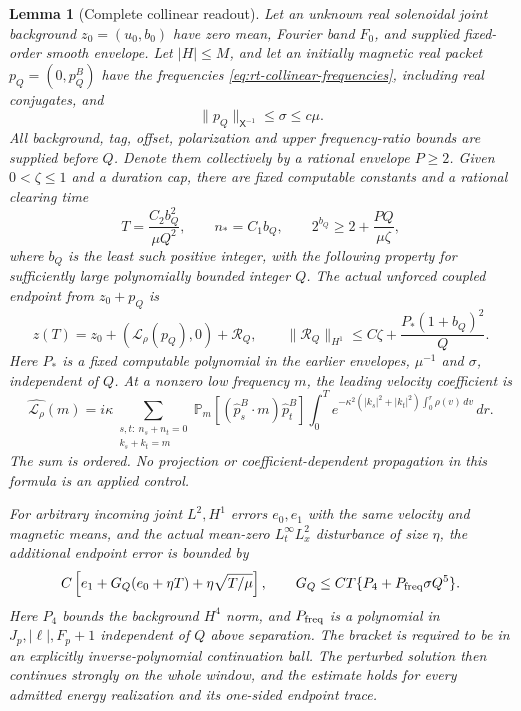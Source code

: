 \documentclass[11pt,a4paper]{amsart}
\newtheorem{lemma}[theorem]{Lemma}
\theoremstyle{definition}
\theoremstyle{remark}
\numberwithin{equation}{section}
\newcommand{\PP}{\mathbb P}
\newcommand{\norm}[1]{\lVert #1\rVert}
\begin{document}
\begin{lemma}[Complete collinear readout]\label{lem:collinear-readout}
Let an unknown real solenoidal joint background $z_0=(u_0,b_0)$ have
zero mean, Fourier band $F_0$, and supplied fixed-order smooth envelope.
Let $|H|\le M$, and let an initially magnetic real packet $p_Q=(0,p_Q^B)$
have the frequencies \eqref{eq:rt-collinear-frequencies}, including real
conjugates, and
\begin{equation}\label{eq:rt-critical-budget}
 \norm{p_Q}_{\mathsf X^{-1}}\le\sigma\le c\mu.
\end{equation}
All background, tag, offset, polarization and upper frequency-ratio bounds
are supplied before $Q$.  Denote them collectively by a rational envelope
$P\ge2$.  Given $0<\zeta\le1$ and a duration cap, there are fixed
computable constants and a rational clearing time
\begin{equation}\label{eq:rt-clearing-time}
 T=\frac{C_2 b_Q^2}{\mu Q^2},\qquad
 n_*=C_1b_Q,\qquad
 2^{b_Q}\ge 2+\frac{PQ}{\mu\zeta},
\end{equation}
where $b_Q$ is the least such positive integer, with the following
property for sufficiently large polynomially bounded integer $Q$.
The actual unforced coupled endpoint from $z_0+p_Q$ is
\begin{equation}\label{eq:rt-complete-endpoint}
 z(T)=z_0+(\mathcal L_\rho(p_Q),0)+\mathcal R_Q,
 \qquad
 \norm{\mathcal R_Q}_{H^1}
       \le C\zeta+\frac{P_*(1+b_Q)^2}{Q}.
\end{equation}
Here $P_*$ is a fixed computable polynomial in the earlier envelopes,
$\mu^{-1}$ and $\sigma$, independent of $Q$.  At a nonzero low frequency
$m$, the leading velocity coefficient is
\begin{equation}\label{eq:rt-leading-coefficient}
 \widehat{\mathcal L_\rho}(m)
 =i\kappa\sum_{\substack{s,t:\ n_s+n_t=0\\k_s+k_t=m}}
 \PP_m[(\widehat p_s^B\cdot m)\widehat p_t^B]
 \int_0^T e^{-\kappa^2(|k_s|^2+|k_t|^2)\int_0^r\rho(v)\,dv}\,dr.
\end{equation}
The sum is ordered.  No projection or coefficient-dependent propagation
in this formula is an applied control.

For arbitrary incoming joint $L^2,H^1$ errors $e_0,e_1$ with the same
velocity and magnetic means, and the actual
mean-zero $L^\infty_tL^2_x$ disturbance of size $\eta$, the additional
endpoint error is bounded by
\begin{equation}\label{eq:rt-rough-errors}
 C\left[e_1+G_Q(e_0+\eta T)+\eta\sqrt{T/\mu}\right],
 \qquad G_Q\le CT\{P_4+P_{\rm freq}\sigma Q^5\}.
\end{equation}
Here $P_4$ bounds the background $H^4$ norm, and $P_{\rm freq}$ is a
polynomial in $J_p,|\ell|,F_p+1$ independent of $Q$ above separation.
The bracket is required to be in an explicitly inverse-polynomial
continuation ball.  The perturbed solution then continues strongly on the
whole window, and the estimate holds for every admitted energy realization
and its one-sided endpoint trace.
\end{lemma}
\end{document}
